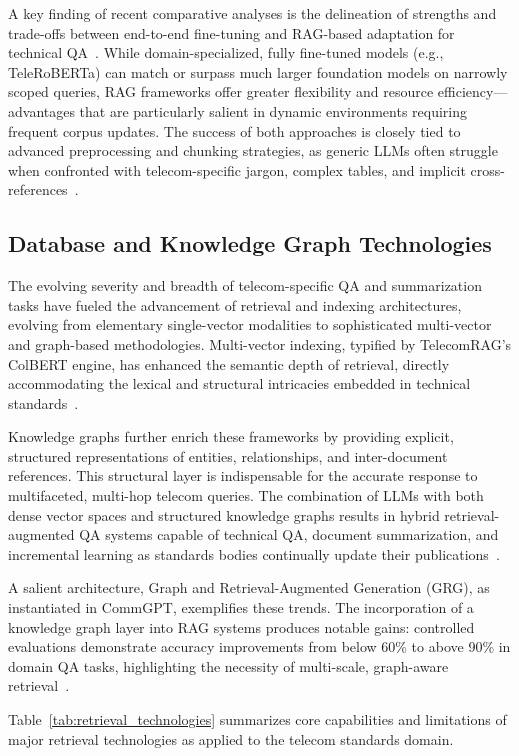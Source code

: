 \documentclass[11pt]{article}
\begin{document}
A key finding of recent comparative analyses is the delineation of strengths and trade-offs between end-to-end fine-tuning and RAG-based adaptation for technical QA~\cite{ref22, ref26}. While domain-specialized, fully fine-tuned models (e.g., TeleRoBERTa) can match or surpass much larger foundation models on narrowly scoped queries, RAG frameworks offer greater flexibility and resource efficiency---advantages that are particularly salient in dynamic environments requiring frequent corpus updates. The success of both approaches is closely tied to advanced preprocessing and chunking strategies, as generic LLMs often struggle when confronted with telecom-specific jargon, complex tables, and implicit cross-references~\cite{ref22}.

\subsection{Database and Knowledge Graph Technologies}

The evolving severity and breadth of telecom-specific QA and summarization tasks have fueled the advancement of retrieval and indexing architectures, evolving from elementary single-vector modalities to sophisticated multi-vector and graph-based methodologies. Multi-vector indexing, typified by TelecomRAG's ColBERT engine, has enhanced the semantic depth of retrieval, directly accommodating the lexical and structural intricacies embedded in technical standards~\cite{ref20, ref21}.

Knowledge graphs further enrich these frameworks by providing explicit, structured representations of entities, relationships, and inter-document references. This structural layer is indispensable for the accurate response to multifaceted, multi-hop telecom queries. The combination of LLMs with both dense vector spaces and structured knowledge graphs results in hybrid retrieval-augmented QA systems capable of technical QA, document summarization, and incremental learning as standards bodies continually update their publications~\cite{ref16, ref20}.

A salient architecture, Graph and Retrieval-Augmented Generation (GRG), as instantiated in CommGPT, exemplifies these trends. The incorporation of a knowledge graph layer into RAG systems produces notable gains: controlled evaluations demonstrate accuracy improvements from below 60\% to above 90\% in domain QA tasks, highlighting the necessity of multi-scale, graph-aware retrieval~\cite{ref21}.

Table~\ref{tab:retrieval_technologies} summarizes core capabilities and limitations of major retrieval technologies as applied to the telecom standards domain.
\end{document}
